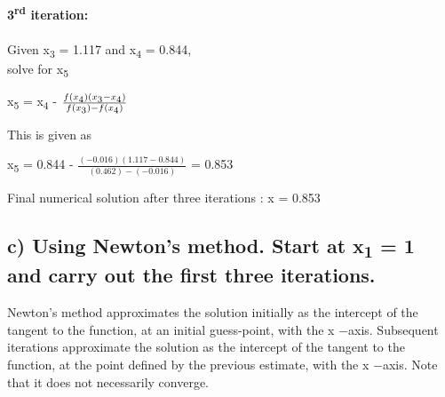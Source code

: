 \documentclass{report}
\begin{document}
             \textbf{3\textsuperscript{rd} iteration:}\\\\
             Given x\textsubscript{3} = 1.117 and x\textsubscript{4} = 0.844,\\
 
             solve for x\textsubscript{5}
 
             \begin{center}
                 x\textsubscript{5} = x\textsubscript{4} - $\frac{f(x\textsubscript{4})(x\textsubscript{3} - x\textsubscript{4})}{f(x\textsubscript{3}) - f(x\textsubscript{4})}$
             \end{center}
 
 
             This is given as 
 
             \begin{center}
                 x\textsubscript{5} = 0.844 - $\frac{(-0.016)(1.117 - 0.844)}{(0.462) - (-0.016)}$ = 0.853
             \end{center}
 
             Final numerical solution after three iterations : x = 0.853





























                


        \subsection*{c) Using Newton's method. Start at x\textsubscript{1} = 1 and carry out the first three iterations.}
             Newton's method approximates the solution initially as the intercept of the tangent to the function, at an initial guess-point, 
             with the x −axis. Subsequent iterations approximate the solution as the intercept of the tangent to the function, at the point 
             defined by the previous estimate, with the x −axis. Note that it does not necessarily converge.\\\\
\end{document}

